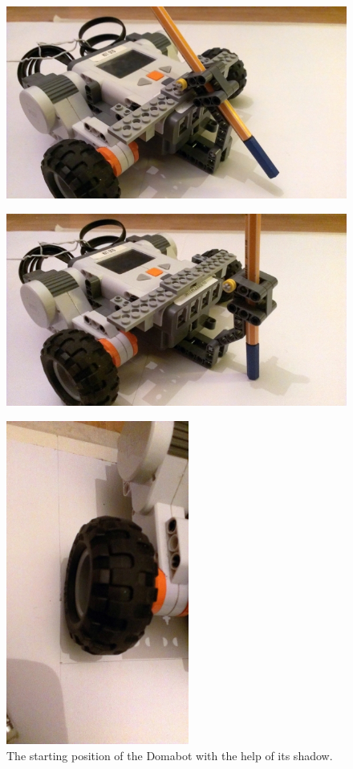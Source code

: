 \documentclass{scrartcl}
\begin{document}
\begin{figure}
\centering
\begin{minipage}{.5\textwidth}
  \centering
  \includegraphics[width=.5\linewidth]{img/pen_up.jpg}
  \label{fig:pen_up}
\end{minipage}%
\begin{minipage}{.5\textwidth}
  \centering
  \includegraphics[width=.5\linewidth]{img/pen_down.jpg}
  \label{fig:pen_down}
\end{minipage}
\end{figure}

\begin{figure}
 \center
 \includegraphics[width= 6cm]{img/wheel_adjust.jpg}
 \caption{The starting position of the Domabot with the help of its shadow.}
 \label{fig:setup}
\end{figure}
\end{document}
